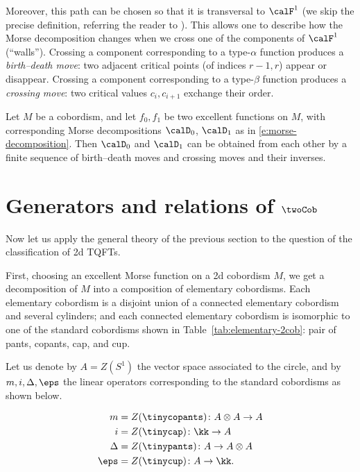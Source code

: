 Moreover, this path can be chosen so that it is transversal to $\calF^1$ (we
skip the precise definition, referring the reader to \cite{hatcher-wagoner}).
This allows one to describe how the Morse decomposition changes when we cross
one of the components of $\calF^1$ (``walls''). Crossing a component
corresponding to a type-$\alpha$ function produces a \emph{birth--death move}:
two adjacent critical points (of indices $r-1, r$) appear or disappear.
Crossing a component corresponding to a type-$\beta$ function produces a
\emph{crossing move}: two critical values $c_i, c_{i+1}$ exchange their order.

\begin{theorem}\label{t:cerf}
  Let $M$ be a cobordism, and let $f_0, f_1$ be two excellent functions on
  $M$, with corresponding Morse decompositions $\calD_0$, $\calD_1$ as in
  \eqref{e:morse-decomposition}. Then $\calD_0$ and $\calD_1$ can be obtained
  from each other by a finite sequence of birth--death moves and crossing
  moves and their inverses.
\end{theorem}


\section{Generators and relations of $\twoCob$}\label{s:2cob-relations}

Now let us apply the general theory of the previous section to the question
of the classification of 2d TQFTs.

First, choosing an excellent Morse function on a 2d cobordism $M$, we get a
decomposition of $M$ into a composition of elementary cobordisms. Each
elementary cobordism is a disjoint union of a connected elementary cobordism and
several cylinders; and each connected elementary cobordism is isomorphic to one
of the standard cobordisms shown in Table~\ref{tab:elementary-2cob}: pair of
pants, copants, cap, and cup.

Let us denote by $A=Z(S^1)$ the vector space associated to the circle, and by
$m, i, \Delta, \eps$ the linear operators corresponding to the standard
cobordisms as shown below.

\begin{equation}\label{e:frobenius-data}
  \begin{aligned}
    m&=Z(\tinycopants)\colon A\otimes A\to A\\
    i&=Z(\tinycap)\colon \kk \to A\\
    \Delta&=Z(\tinypants)\colon A\to A\otimes A\\
    \eps&=Z(\tinycup)\colon A\to \kk.
  \end{aligned}
\end{equation}




